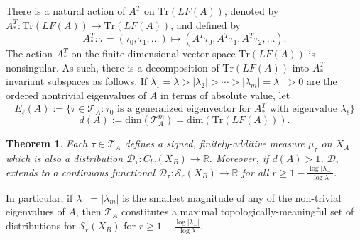 \documentclass[12pt]{amsart}
\theoremstyle{plain}
\newtheorem{theorem}{Theorem}[section]
\theoremstyle{definition}
\begin{document}
There is a natural action of $A^T$ on $\mathrm{Tr}(LF(A))$, denoted by $A^T_*:\mathrm{Tr}(LF(A))\rightarrow \mathrm{Tr}(LF(A))$, and defined by
$$A^T_*:\tau = (\tau_0,\tau_1,\dots) \mapsto (A^T\tau_0, A^T\tau_1, A^T\tau_2,\dots).$$
The action $A^T_*$ on the finite-dimensional vector space $\mathrm{Tr}(LF(A))$ is nonsingular. As such, there is a decomposition of $\mathrm{Tr}(LF(A))$ into $A^T_*$-invariant subspaces as follows.
If $\lambda_1 = \lambda > |\lambda_2| > \cdots > |\lambda_m| = \lambda_- >0$ are the ordered nontrivial eigenvalues of $A$ in terms of absolute value, let
\begin{equation}
    \label{eqn:decomp}  
E_\ell(A) := \{ \tau\in \mathcal{T} _A: \tau_0 \mbox{ is a generalized eigenvector for }A^T_*\mbox{ with eigenvalue }\lambda_\ell \}
\end{equation}
$$d(A):= \mathrm{dim}(\mathcal{ T}^{ m}_A ) = \mathrm{dim}(\mathrm{Tr}(LF(A))).$$
\begin{theorem}
    \label{thm:extension}
    Each $\tau\in\mathcal{T} _A$ defines a signed, finitely-additive measure $\mu_\tau$ on $X_A $ which is also a distribution $\mathcal{D}_\tau:C_{lc}(X_B)\rightarrow \mathbb{R}$.  Moreover, if $d(A)>1$, $\mathcal{D}_\tau$ extends to a continuous functional $\mathcal{D}_\tau:\mathcal{S} _r(X_B)\rightarrow \mathbb{R}$ for all $r\geq 1-\frac{\log |\lambda_-|}{\log \lambda}$.
\end{theorem}
In particular, if $\lambda_- = |\lambda_m|$ is the smallest magnitude of any of the non-trivial eigenvalues of $A$, then $\mathcal{T} _A$ constitutes a maximal topologically-meaningful set of distributions for $\mathcal{S} _r(X_B)$ for $r\geq 1-\frac{\log |\lambda_-|}{\log \lambda}$. 
\end{document}
